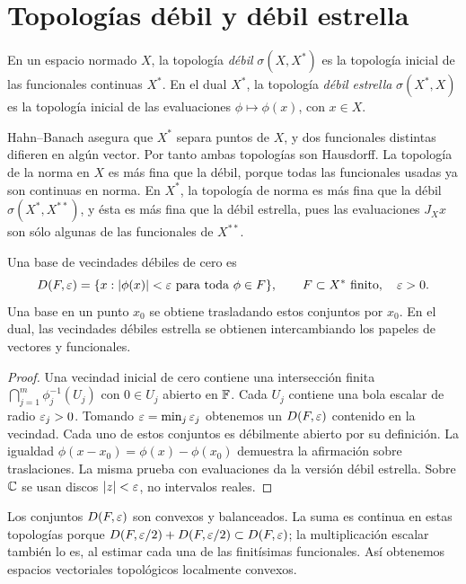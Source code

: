 \section{Topologías débil y débil estrella}
\begin{definicion}\label{v3:topologia-debil}
En un espacio normado $X$, la topología \emph{débil} $\sigma(X,X^*)$ es la topología inicial de las funcionales continuas $X^*$. En el dual $X^*$, la topología \emph{débil estrella} $\sigma(X^*,X)$ es la topología inicial de las evaluaciones $\phi\mapsto\phi(x)$, con $x\in X$.
\end{definicion}
\label{v3:topologia-debil-estrella}
Hahn--Banach asegura que $X^*$ separa puntos de $X$, y dos funcionales distintas difieren en algún vector. Por tanto ambas topologías son Hausdorff. La topología de la norma en $X$ es más fina que la débil, porque todas las funcionales usadas ya son continuas en norma. En $X^*$, la topología de norma es más fina que la débil $\sigma(X^*,X^{**})$, y ésta es más fina que la débil estrella, pues las evaluaciones $J_Xx$ son sólo algunas de las funcionales de $X^{**}$.

\begin{proposicion}\label{v3:vecindades-debiles}
Una base de vecindades débiles de cero es
\[D(F,\varepsilon)=\{x:|\phi(x)|<\varepsilon\text{ para toda }\phi\in F\},
\qquad F\subset X^*\text{ finito},\quad\varepsilon>0.
\]
Una base en un punto $x_0$ se obtiene trasladando estos conjuntos por $x_0$. En el dual, las vecindades débiles estrella se obtienen intercambiando los papeles de vectores y funcionales.
\end{proposicion}
\begin{proof}
Una vecindad inicial de cero contiene una intersección finita $\bigcap_{j=1}^m\phi_j^{-1}(U_j)$ con $0\in U_j$ abierto en $\mathbb F$. Cada $U_j$ contiene una bola escalar de radio $\varepsilon_j>0$. Tomando $\varepsilon=\min_j\varepsilon_j$ obtenemos un $D(F,\varepsilon)$ contenido en la vecindad. Cada uno de estos conjuntos es débilmente abierto por su definición. La igualdad $\phi(x-x_0)=\phi(x)-\phi(x_0)$ demuestra la afirmación sobre traslaciones. La misma prueba con evaluaciones da la versión débil estrella. Sobre $\mathbb C$ se usan discos $|z|<\varepsilon$, no intervalos reales.
\end{proof}
Los conjuntos $D(F,\varepsilon)$ son convexos y balanceados. La suma es continua en estas topologías porque $D(F,\varepsilon/2)+D(F,\varepsilon/2)\subset D(F,\varepsilon)$; la multiplicación escalar también lo es, al estimar cada una de las finitísimas funcionales. Así obtenemos espacios vectoriales topológicos localmente convexos.

